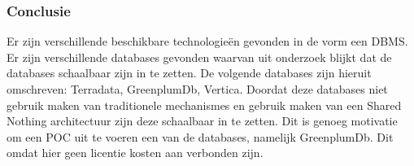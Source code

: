 \subsubsection{\textbf{Conclusie}}

Er zijn verschillende beschikbare technologieën gevonden in de vorm een DBMS. Er zijn verschillende databases gevonden waarvan uit onderzoek blijkt dat de databases schaalbaar zijn in te zetten. De volgende databases zijn hieruit omschreven: Terradata, GreenplumDb, Vertica. Doordat deze databases niet gebruik maken van traditionele mechanismes en gebruik maken van een Shared Nothing architectuur zijn deze schaalbaar in te zetten. Dit is genoeg motivatie om een POC uit te voeren een van de databases, namelijk GreenplumDb. Dit omdat hier geen licentie kosten aan verbonden zijn.
